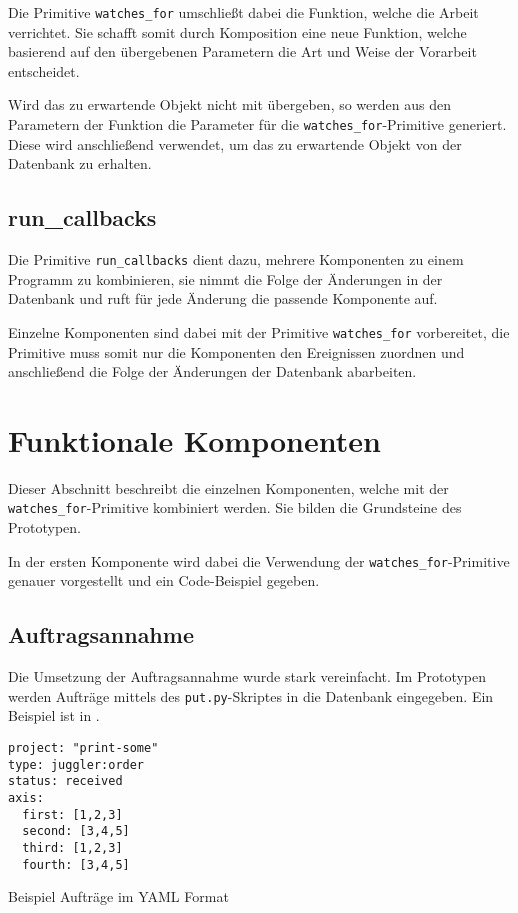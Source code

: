 Die Primitive \verb|watches_for| umschließt dabei die Funktion,
welche die Arbeit verrichtet. Sie schafft somit durch Komposition eine neue Funktion,
welche basierend auf den übergebenen Parametern die Art und Weise der Vorarbeit entscheidet.

Wird das zu erwartende Objekt nicht mit übergeben, so werden aus den Parametern der Funktion die Parameter für die \verb|watches_for|-Primitive generiert.
Diese wird anschließend verwendet, um das zu erwartende Objekt von der Datenbank zu erhalten.



\subsection{run\_callbacks}

Die Primitive \verb|run_callbacks| dient dazu, mehrere Komponenten zu einem Programm
zu kombinieren, sie nimmt die Folge der Änderungen in der Datenbank und
ruft für jede Änderung die passende Komponente auf.

Einzelne Komponenten sind dabei mit der Primitive \verb|watches_for| vorbereitet,
die Primitive muss somit nur die Komponenten den Ereignissen zuordnen
und anschließend die Folge der Änderungen der Datenbank abarbeiten.

\section{Funktionale Komponenten}
\label{sec:imp:komponenten}

Dieser Abschnitt beschreibt die einzelnen Komponenten,
welche mit der \verb|watches_for|-Primitive kombiniert werden.
Sie bilden die Grundsteine des Prototypen.

In der ersten Komponente wird dabei die Verwendung der \verb|watches_for|-Primitive genauer vorgestellt und ein Code-Beispiel gegeben.

\subsection{Auftragsannahme}

Die Umsetzung der Auftragsannahme wurde stark vereinfacht.
Im Prototypen werden Aufträge mittels des \verb|put.py|-Skriptes in die Datenbank eingegeben.
Ein Beispiel ist in .

\begin{listing}[h]
\begin{verbatim}
project: "print-some"
type: juggler:order
status: received
axis:
  first: [1,2,3]
  second: [3,4,5]
  third: [1,2,3]
  fourth: [3,4,5]
\end{verbatim}
\caption{Beispiel Auftr\"age im YAML Format}
\label{fig:auftrag-beispieldaten}
\end{listing}

